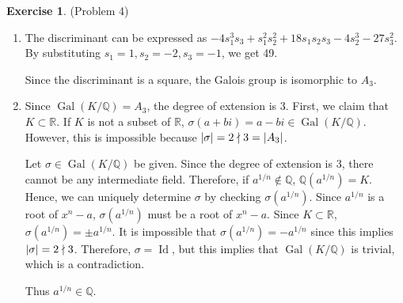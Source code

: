 \documentclass[12pt, psamsfonts]{amsart}
\theoremstyle{definition}
\newtheorem*{exer}{Exercise}
\theoremstyle{remark}
\DeclareMathOperator{\Id}{Id}
\DeclareMathOperator{\Gal}{Gal}
\numberwithin{equation}{section}
\begin{document}
\begin{exer}{(Problem 4)}
  \begin{enumerate}[label=(\roman*)]
    \item 
      The discriminant can be expressed as $-4s_{1}^{3}s_{3}+s_{1}^{2}s_{2}^{2}+18s_{1}s_{2}s_{3}-4s_{2}^{3}-27s_{3}^{2}$.
      By substituting $s_1 = 1, s_2 = -2, s_3 = -1$, we get 49.
      \mathligsoff
      
      \mathligson
      Since the discriminant is a square, the Galois group is isomorphic to $A_3$.
    \item
      Since $\Gal(K/\mathbb{Q}) = A_3$, the degree of extension is 3.
      First, we claim that $K \subset \mathbb{R}$.
      If $K$ is not a subset of $\mathbb{R}$, $\sigma(a + bi) = a - bi \in \Gal(K/\mathbb{Q})$.
      However, this is impossible because $\abs{\sigma} = 2 \nmid 3 = \abs{A_3}$.

      Let $\sigma \in \Gal(K/\mathbb{Q})$ be given.
      Since the degree of extension is 3, there cannot be any intermediate field.
      Therefore, if $a^{1/n} \notin \mathbb{Q}$, $\mathbb{Q}(a^{1/n}) = K$.
      Hence, we can uniquely determine $\sigma$ by checking $\sigma(a^{1/n})$.
      Since $a^{1/n}$ is a root of $x^n - a$, $\sigma(a^{1/n})$ must be a root of $x^n - a$.
      Since $K \subset \mathbb{R}$, $\sigma(a^{1/n}) = \pm a^{1/n}$.
      It is impossible that $\sigma(a^{1/n}) = -a^{1/n}$ since this implies $\abs{\sigma} = 2 \nmid 3$.
      Therefore, $\sigma = \Id$, but this implies that $\Gal(K/\mathbb{Q})$ is trivial, which is a contradiction.

      Thus $a^{1/n} \in \mathbb{Q}$.
  \end{enumerate}
\end{exer}
\end{document}
